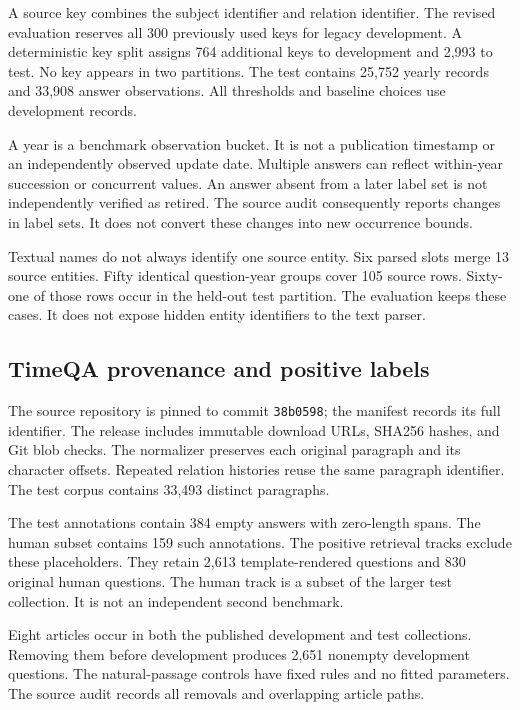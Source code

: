 A source key combines the subject identifier and relation identifier.
The revised evaluation reserves all 300 previously used keys for legacy development.
A deterministic key split assigns 764 additional keys to development and 2,993 to test.
No key appears in two partitions.
The test contains 25,752 yearly records and 33,908 answer observations.
All thresholds and baseline choices use development records.

A year is a benchmark observation bucket.
It is not a publication timestamp or an independently observed update date.
Multiple answers can reflect within-year succession or concurrent values.
An answer absent from a later label set is not independently verified as retired.
The source audit consequently reports changes in label sets.
It does not convert these changes into new occurrence bounds.

Textual names do not always identify one source entity.
Six parsed slots merge 13 source entities.
Fifty identical question-year groups cover 105 source rows.
Sixty-one of those rows occur in the held-out test partition.
The evaluation keeps these cases.
It does not expose hidden entity identifiers to the text parser.

\subsection{TimeQA provenance and positive labels}
The source repository is pinned to commit
\texttt{38b0598}; the manifest records its full identifier.
The release includes immutable download URLs, SHA256 hashes, and Git blob checks.
The normalizer preserves each original paragraph and its character offsets.
Repeated relation histories reuse the same paragraph identifier.
The test corpus contains 33,493 distinct paragraphs.

The test annotations contain 384 empty answers with zero-length spans.
The human subset contains 159 such annotations.
The positive retrieval tracks exclude these placeholders.
They retain 2,613 template-rendered questions and 830 original human questions.
The human track is a subset of the larger test collection.
It is not an independent second benchmark.

Eight articles occur in both the published development and test collections.
Removing them before development produces 2,651 nonempty development questions.
The natural-passage controls have fixed rules and no fitted parameters.
The source audit records all removals and overlapping article paths.

